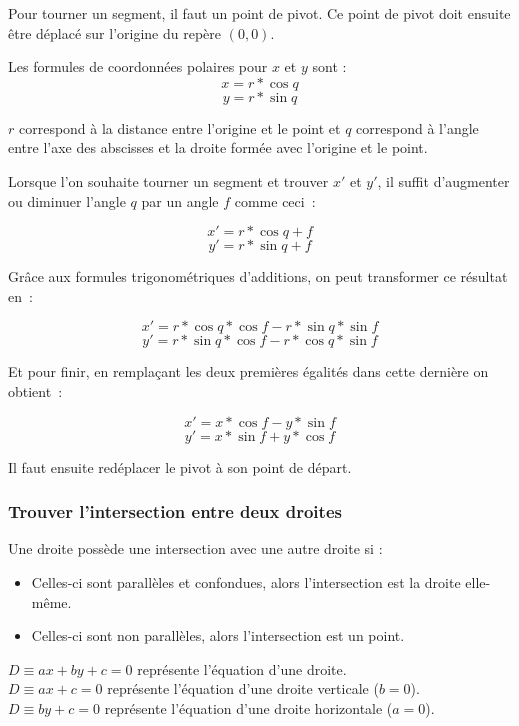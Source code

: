 \documentclass[]{report}
\begin{document}
Pour tourner un segment, il faut un point de pivot. Ce point de pivot
doit ensuite être déplacé sur l'origine du repère $ (0, 0) $.

Les formules de coordonnées polaires pour $ x $ et $ y $ sont :
$$ x = r * \cos{q} $$ 
$$ y = r * \sin{q} $$

$ r $ correspond à la distance entre l'origine et le point et $ q $ correspond 
à l'angle entre l'axe des abscisses et la droite formée avec l'origine et le point.

Lorsque l'on souhaite tourner un segment et trouver $ x' $ et $ y' $, 
il suffit d'augmenter ou diminuer l'angle $ q $ par un angle $ f $ comme ceci~:

$$ x' = r * \cos{q + f} $$
$$ y' = r * \sin{q + f} $$

Grâce aux formules trigonométriques d'additions, on peut transformer ce résultat en~:

$$ x' = r * \cos{q} * \cos{f} - r * \sin{q} * \sin{f} $$
$$ y' = r * \sin{q} * \cos{f} - r * \cos{q} * \sin{f} $$

Et pour finir, en remplaçant les deux premières égalités dans cette dernière on obtient~: 

$$ x' = x * \cos{f} - y * \sin{f} $$
$$ y' = x * \sin{f} + y * \cos{f} $$

Il faut ensuite redéplacer le pivot à son point de départ.

\newpage
\subsubsection{\label{AnnexeIntersects}Trouver l'intersection entre deux droites}

Une droite possède une intersection avec une autre droite si :
\begin{itemize}
    \item Celles-ci sont parallèles et confondues, alors l'intersection est la droite elle-même.
    \item Celles-ci sont non parallèles, alors l'intersection est un point. \\
\end{itemize} 

$ D \equiv ax + by + c = 0 $ représente l'équation d'une droite. \\
$ D \equiv ax + c = 0 $ représente l'équation d'une droite verticale ($b = 0$). \\
$ D \equiv by + c = 0 $ représente l'équation d'une droite horizontale ($a = 0$). \\
\end{document}
